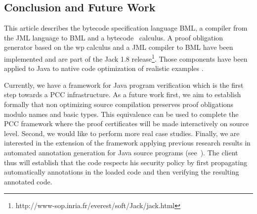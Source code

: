 \subsection{Conclusion and Future Work}\label{conclusion}
This article describes the bytecode specification language BML, a compiler from the JML language to BML and a bytecode \wpi \ calculus.
A proof obligation generator based on the wp calculus and a JML compiler to BML have been implemented and are part of the Jack 1.8 release\footnote{http://www-sop.inria.fr/everest/soft/Jack/jack.html}. Those components have been applied to Java to native code optimization of realistic examples \cite{CPG06LFN}.  


Currently, we have a framework for Java program verification which is the first step towards a PCC infrastructure.
 As a future work first, we aim to establish formally that non optimizing source compilation
preserves proof obligations modulo names and basic types. This equivalence can
 be used to complete the PCC framework where the proof certificates will be made interactively on source level. Second, we would like to perform more real case studies. 
Finally, we are interested in 
the extension of the framework applying previous research results in automated annotation generation for Java source programs (see~\cite{m+04:cardis}). The client thus will establish that the code respects his security policy %
by first propagating automatically annotations in the loaded code and then verifying the resulting annotated code.





